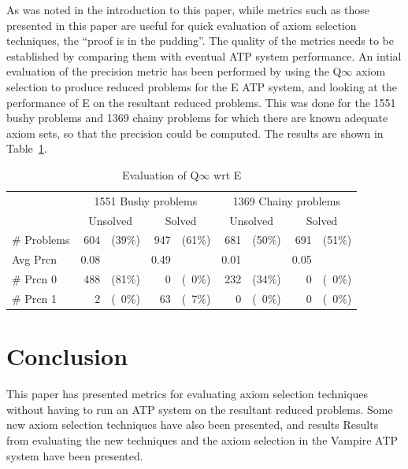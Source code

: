 \documentclass[EPiC]{easychair}
\begin{document}
As was noted in the introduction to this paper, while metrics such as
those presented in this paper are useful for quick evaluation of axiom
selection techniques, the ``proof is in the pudding''.
The quality of the metrics needs to be established by comparing them with 
eventual ATP system performance.
An intial evaluation of the precision metric has been performed by using
the Q$\infty$ axiom selection to produce reduced problems for the E ATP
system, and looking at the performance of E on the resultant reduced problems.
This was done for the 1551 bushy problems and 1369 chainy problems for
which there are known adequate axiom sets, so that the precision could
be computed.
The results are shown in Table~\ref{EvaluationOfMetrics}.

\begin{table}[hbt]
\begin{center}
\begin{tabular}{|l|rr|rr|rr|rr|}
\hline
                & \multicolumn{4}{|c|}{1551 Bushy problems} & \multicolumn{4}{|c|}{1369 Chainy problems} \\
                & \multicolumn{2}{|c|}{Unsolved} & \multicolumn{2}{|c|}{Solved} & \multicolumn{2}{|c|}{Unsolved} & \multicolumn{2}{|c|}{Solved} \\
\hline
\# Problems     &  604 & (39\%) &  947 & (61\%) &  681 & (50\%) &  691 & (51\%) \\
Avg Prcn        & 0.08 &        & 0.49 &        & 0.01 &        & 0.05 &        \\
\# Prcn 0       &  488 & (81\%) &    0 & (~0\%) &  232 & (34\%) &    0 & (~0\%) \\
\# Prcn 1       &    2 & (~0\%) &   63 & (~7\%) &    0 & (~0\%) &    0 & (~0\%) \\
\hline
\end{tabular}
\caption{Evaluation of Q$\infty$ wrt E}
\label{EvaluationOfMetrics}
\end{center}
\end{table}

\section{Conclusion}
\label{Conclusion}

This paper has presented metrics for evaluating axiom selection techniques
without having to run an ATP system on the resultant reduced problems.
Some new axiom selection techniques have also been presented, and results
Results from evaluating the new techniques and the axiom selection in the 
Vampire ATP system have been presented.
\end{document}

